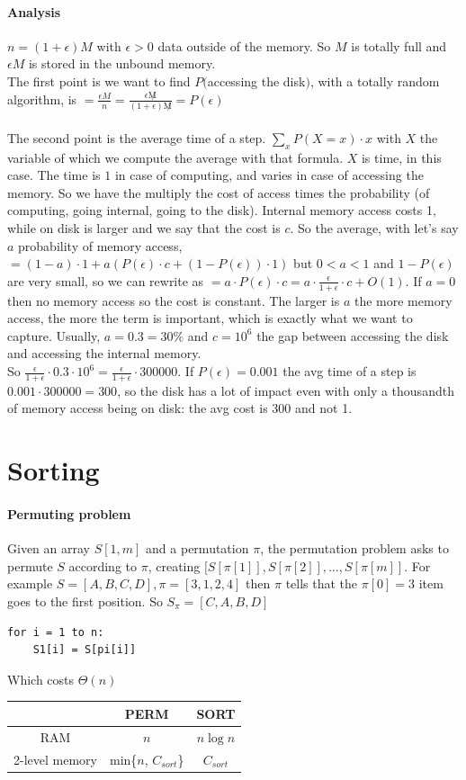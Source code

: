 \documentclass[10pt]{report}
\begin{document}
\paragraph{Analysis}
$n = (1 + \epsilon)M$ with $\epsilon > 0$ data outside of the memory. So $M$ is totally full and $\epsilon M$ is stored in the unbound memory.\\
The first point is we want to find $P($accessing the disk$)$, with a totally random algorithm, is $= \frac{\epsilon M}{n} = \frac{\epsilon\not M}{(1 + \epsilon)\not M} = P(\epsilon)$\\\\
The second point is the average time of a step. $\sum_x P(X = x)\cdot x$ with $X$ the variable of which we compute the average with that formula. $X$ is time, in this case. The time is $1$ in case of computing, and varies in case of accessing the memory. So we have the multiply the cost of access times the probability (of computing, going internal, going to the disk). Internal memory access costs 1, while on disk is larger and we say that the cost is $c$. So the average, with let's say $a$ probability of memory access, $= (1 - a)\cdot 1 + a(P(\epsilon)\cdot c + (1 - P(\epsilon))\cdot 1)$ but $0 < a < 1$ and $1 - P(\epsilon)$ are very small, so we can rewrite as $= a\cdot P(\epsilon)\cdot c = a \cdot \frac{\epsilon}{1 + \epsilon} \cdot c + O(1)$. If $a = 0$ then no memory access so the cost is constant. The larger is $a$ the more memory access, the more the term is important, which is exactly what we want to capture. Usually, $a = 0.3 = 30\%$ and $c = 10^6$ the gap between accessing the disk and accessing the internal memory.\\
So $\frac{\epsilon}{1 + \epsilon}\cdot 0.3 \cdot 10^6 = \frac{\epsilon}{1 + \epsilon} \cdot 300000$. If $P(\epsilon) = 0.001$ the avg time of a step is $0.001 \cdot 300000 = 300$, so the disk has a lot of impact even with only a thousandth of memory access being on disk: the avg cost is 300 and not 1.
\section{Sorting}
\paragraph{Permuting problem} Given an array $S[1, m]$ and a permutation $\pi$, the permutation problem asks to permute $S$ according to $\pi$, creating $[S[\pi[1]], S[\pi[2]],\ldots,S[\pi[m]]$. For example $S = [A, B, C, D], \pi = [3, 1, 2, 4]$ then $\pi$ tells that the $\pi[0] = 3$ item goes to the first position. So $S_\pi = [C, A, B, D]$
\begin{lstlisting}[style=myPython]
for i = 1 to n:
	S1[i] = S[pi[i]]
\end{lstlisting}
Which costs $\Theta(n)$\\
\begin{tabular}{c | c | c}
 & PERM & SORT \\
\hline
RAM & $n$ & $n\log n$\\
\hline
2-level memory & min\{$n$, $C_{sort}$\} & $C_{sort}$
\end{tabular}
\pagebreak
\end{document}
